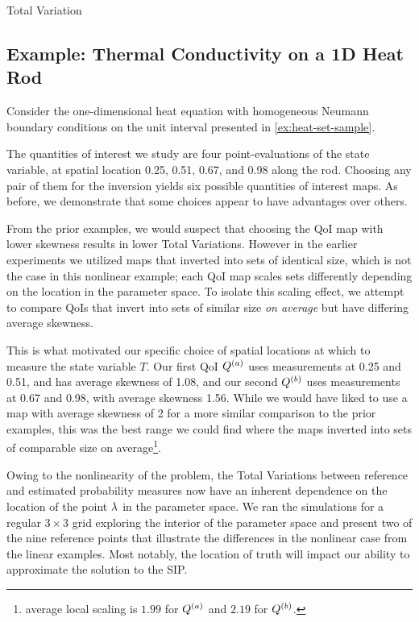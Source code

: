 Total Variation\subsection{Example: Thermal Conductivity on a 1D Heat Rod}\label{ex:heat-set-sample-accuracy}

Consider the one-dimensional heat equation with homogeneous Neumann boundary conditions on the unit interval presented in \ref{ex:heat-set-sample}.


The quantities of interest we study are four point-evaluations of the state variable, at spatial location 0.25, 0.51, 0.67, and 0.98 along the rod.
Choosing any pair of them for the inversion yields six possible quantities of interest maps.
As before, we demonstrate that some choices appear to have advantages over others.

From the prior examples, we would suspect that choosing the QoI map with lower skewness results in lower Total Variations.
However in the earlier experiments we utilized maps that inverted into sets of identical size, which is not the case in this nonlinear example; each QoI map scales sets differently depending on the location in the parameter space.
To isolate this scaling effect, we attempt to compare QoIs that invert into sets of similar size \emph{on average} but have differing average skewness.

This is what motivated our specific choice of spatial locations at which to measure the state variable $T$.
Our first QoI $Q^{(a)}$ uses measurements at 0.25 and 0.51, and has average skewness of 1.08, and our second $Q^{(b)}$ uses measurements at 0.67 and 0.98, with average skewness 1.56.
While we would have liked to use a map with average skewness of 2 for a more similar comparison to the prior examples, this was the best range we could find where the maps inverted into sets of comparable size on average\footnote{average local scaling is $1.99$ for $Q^{(a)}$ and $2.19$ for $Q^{(b)}$.}.

Owing to the nonlinearity of the problem, the Total Variations between reference and estimated probability measures now have an inherent dependence on the location of the point $\lambda$ in the parameter space.
We ran the simulations for a regular $3\times3$ grid exploring the interior of the parameter space and present two of the nine reference points that illustrate the differences in the nonlinear case from the linear examples.
Most notably, the location of truth will impact our ability to approximate the solution to the SIP. 

